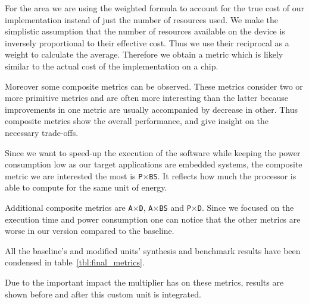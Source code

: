 For the area we are using the weighted formula to account for the true cost of our implementation instead of just the number of resources used.
We make the simplistic assumption that the number of resources available on the device is inversely proportional to their effective cost. Thus we use their reciprocal as a weight to calculate the average. Therefore we obtain a metric which is likely similar to the actual cost of the implementation on a chip.

Moreover some composite metrics can be observed. These metrics consider two or more primitive
metrics and are often more interesting than the latter because improvements in one metric are usually accompanied by decrease in other.
Thus composite metrics show the overall performance, and give insight on the necessary trade-offs.

Since we want to speed-up the execution of the software while keeping the power consumption
low as our target applications are embedded systems, the composite metric we are
interested the most is \texttt{P$\times$BS}. It reflects how much the processor is able to compute for the same unit of energy.

Additional composite metrics are \texttt{A$\times$D}, \texttt{A$\times$BS} and \texttt{P$\times$D}. Since we focused on the
execution time and power consumption one can notice that the other metrics are worse in our version
compared to the baseline.

All the baseline's and modified units' synthesis and benchmark results have been condensed in table~\ref{tbl:final_metrics}.

 Due to the important impact the multiplier has on these metrics, results are shown before and after this custom unit is integrated.

